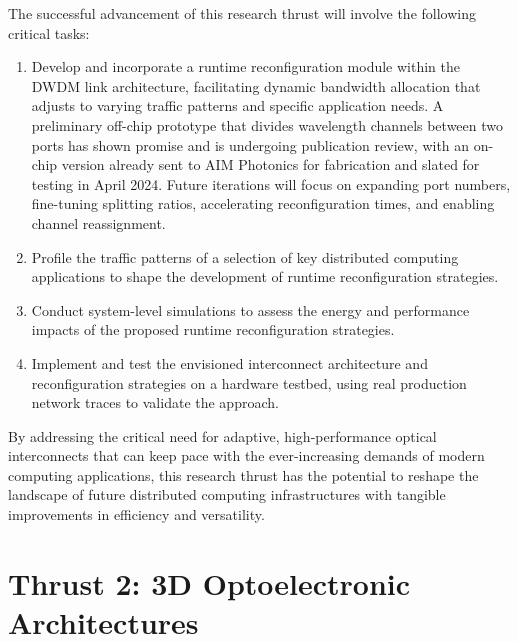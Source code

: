 The successful advancement of this research thrust will involve the following critical tasks:
\begin{enumerate}[nosep]
    \item Develop and incorporate a runtime reconfiguration module within the DWDM link architecture, facilitating dynamic bandwidth allocation that adjusts to varying traffic patterns and specific application needs. A preliminary off-chip prototype that divides wavelength channels between two ports has shown promise and is undergoing publication review, with an on-chip version already sent to AIM Photonics for fabrication and slated for testing in April 2024. Future iterations will focus on expanding port numbers, fine-tuning splitting ratios, accelerating reconfiguration times, and enabling channel reassignment.
    \item Profile the traffic patterns of a selection of key distributed computing applications to shape the development of runtime reconfiguration strategies.
    \item Conduct system-level simulations to assess the energy and performance impacts of the proposed runtime reconfiguration strategies.
    \item Implement and test the envisioned interconnect architecture and reconfiguration strategies on a hardware testbed, using real production network traces to validate the approach.
\end{enumerate}
By addressing the critical need for adaptive, high-performance optical interconnects that can keep pace with the ever-increasing demands of modern computing applications, this research thrust has the potential to reshape the landscape of future distributed computing infrastructures with tangible improvements in efficiency and versatility.

\section{Thrust 2: 3D Optoelectronic Architectures}

